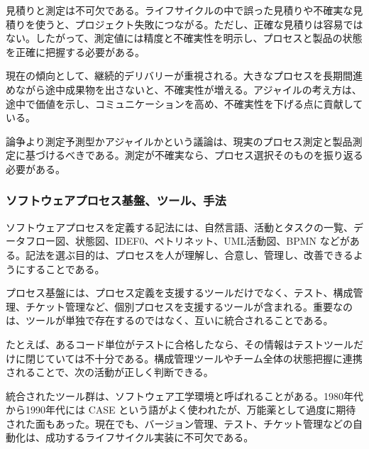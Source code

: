 \documentclass[a4paper,11pt]{ltjsarticle}
\numberwithin{figure}{section}
\numberwithin{table}{section}
\begin{document}
見積りと測定は不可欠である。ライフサイクルの中で誤った見積りや不確実な見積りを使うと、プロジェクト失敗につながる。ただし、正確な見積りは容易ではない。したがって、測定値には精度と不確実性を明示し、プロセスと製品の状態を正確に把握する必要がある。

現在の傾向として、継続的デリバリーが重視される。大きなプロセスを長期間進めながら途中成果物を出さないと、不確実性が増える。アジャイルの考え方は、途中で価値を示し、コミュニケーションを高め、不確実性を下げる点に貢献している。

\begin{pointbox}{論争より測定}予測型かアジャイルかという議論は、現実のプロセス測定と製品測定に基づけるべきである。測定が不確実なら、プロセス選択そのものを振り返る必要がある。\end{pointbox}
\subsubsection{ソフトウェアプロセス基盤、ツール、手法}
ソフトウェアプロセスを定義する記法には、自然言語、活動とタスクの一覧、データフロー図、状態図、IDEF0、ペトリネット、UML活動図、BPMN などがある。記法を選ぶ目的は、プロセスを人が理解し、合意し、管理し、改善できるようにすることである。

プロセス基盤には、プロセス定義を支援するツールだけでなく、テスト、構成管理、チケット管理など、個別プロセスを支援するツールが含まれる。重要なのは、ツールが単独で存在するのではなく、互いに統合されることである。

たとえば、あるコード単位がテストに合格したなら、その情報はテストツールだけに閉じていては不十分である。構成管理ツールやチーム全体の状態把握に連携されることで、次の活動が正しく判断できる。

統合されたツール群は、ソフトウェア工学環境と呼ばれることがある。1980年代から1990年代には CASE という語がよく使われたが、万能薬として過度に期待された面もあった。現在でも、バージョン管理、テスト、チケット管理などの自動化は、成功するライフサイクル実装に不可欠である。
\end{document}
